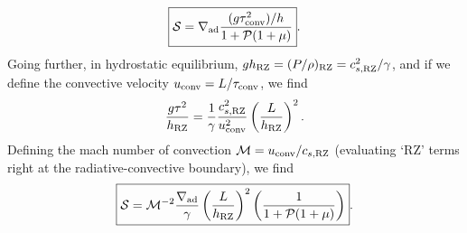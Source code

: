 \documentclass[onecolumn, amsmath, amsfonts, amssymb]{aastex62}
\newcommand{\grad}{\ensuremath{\nabla}}
\newcommand{\mS}{\ensuremath{\mathcal{S}}}
\begin{document}
\begin{enumerate}
        \begin{equation}
            \boxed{
                \mS = \grad_{\rm{ad}}\frac{ (g \tau_{\rm{conv}}^2) / h}{1 + \mathcal{P}(1 + \mu)}
            }.
        \end{equation}
        Going further, in hydrostatic equilibrium, $g h_{\rm{RZ}} = (P/\rho)_{\rm{RZ}} = c_{s,\rm{RZ}}^2 / \gamma$, and if we define the convective velocity $u_{\rm{conv}} = L/\tau_{\rm{conv}}$, we find
        \begin{equation}
            \frac{g \tau^2}{h_{\rm{RZ}}} = \frac{1}{\gamma}\frac{c_{s,\rm{RZ}}^2}{u_{\rm{conv}}^2}\left(\frac{L}{h_{\rm{RZ}}}\right)^2.
        \end{equation}
        Defining the mach number of convection $\mathcal{M} = u_{\rm{conv}}/c_{s,\rm{RZ}}$ (evaluating `RZ' terms right at the radiative-convective boundary), we find
        \begin{equation}
            \boxed{
                \mS = \mathcal{M}^{-2}\frac{\grad_{\rm{ad}}}{\gamma}\left(\frac{L}{h_{\rm{RZ}}}\right)^2\left(\frac{1}{1 + \mathcal{P}(1 + \mu)}\right)}.
        \end{equation}
\end{enumerate}
\end{document}
